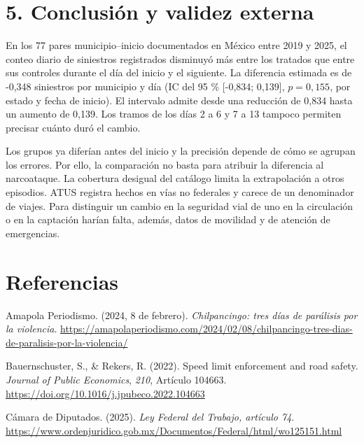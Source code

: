 \documentclass[11pt,letterpaper]{article}
\begin{document}
\section*{5. Conclusión y validez externa}

En los 77 pares municipio--inicio documentados en México entre 2019 y 2025, el conteo diario de siniestros registrados disminuyó más entre los tratados que entre sus controles durante el día del inicio y el siguiente. La diferencia estimada es de -0,348 siniestros por municipio y día (IC del 95 \% [-0,834; 0,139], $p=0{,}155$, por estado y fecha de inicio). El intervalo admite desde una reducción de 0,834 hasta un aumento de 0,139. Los tramos de los días 2 a 6 y 7 a 13 tampoco permiten precisar cuánto duró el cambio.\par

Los grupos ya diferían antes del inicio y la precisión depende de cómo se agrupan los errores. Por ello, la comparación no basta para atribuir la diferencia al narcoataque. La cobertura desigual del catálogo limita la extrapolación a otros episodios. ATUS registra hechos en vías no federales y carece de un denominador de viajes. Para distinguir un cambio en la seguridad vial de uno en la circulación o en la captación harían falta, además, datos de movilidad y de atención de emergencias.\par

\clearpage

\section*{Referencias}

\begingroup\setlength{\parskip}{0.3em}

\par\hangindent=0.5in\noindent Amapola Periodismo. (2024, 8 de febrero). \emph{Chilpancingo: tres días de parálisis por la violencia}. \url{https://amapolaperiodismo.com/2024/02/08/chilpancingo-tres-dias-de-paralisis-por-la-violencia/}\par

\par\hangindent=0.5in\noindent Bauernschuster, S., \& Rekers, R. (2022). Speed limit enforcement and road safety. \emph{Journal of Public Economics}, \emph{210}, Artículo 104663. \url{https://doi.org/10.1016/j.jpubeco.2022.104663}\par

\par\hangindent=0.5in\noindent Cámara de Diputados. (2025). \emph{Ley Federal del Trabajo, artículo 74}. \url{https://www.ordenjuridico.gob.mx/Documentos/Federal/html/wo125151.html}\par
\end{document}
